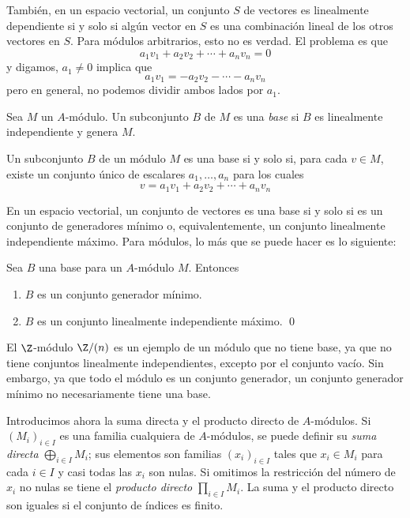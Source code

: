 También, en un espacio vectorial, un conjunto $S$ de vectores es linealmente dependiente si y solo si algún vector en $S$ es una combinación lineal de los otros vectores en $S$. Para módulos arbitrarios, esto no es verdad. El problema es que
\[
  a_1v_1 + a_2v_2 + \cdots + a_nv_n = 0
\]
y digamos, $a_1 \neq 0$ implica que 
\[
  a_1v_1 = -a_2v_2 - \cdots - a_nv_n
\]
pero en general, no podemos dividir ambos lados por $a_1$.

\begin{definition}
  Sea $M$ un $A$-módulo. Un subconjunto $B$ de $M$ es una \emph{base} si $B$ es linealmente independiente y genera $M$.
\end{definition}

\begin{theorem}
  Un subconjunto $B$ de un módulo $M$ es una base si y solo si, para cada $v \in M$, existe un conjunto único de escalares $a_1,\ldots,a_n$ para los cuales
  \[
    v = a_1v_1 + a_2v_2 + \cdots + a_nv_n \tag*{\qed}
  \]
\end{theorem}

En un espacio vectorial, un conjunto de vectores es una base si y solo si es un conjunto de generadores mínimo o, equivalentemente, un conjunto linealmente independiente máximo. Para módulos, lo más que se puede hacer es lo siguiente:

\begin{theorem}\label{theo:1.7.5}%
  Sea $B$ una base para un $A$-módulo $M$. Entonces
  \begin{enumerate}
    \item $B$ es un conjunto generador mínimo.
    \item $B$ es un conjunto linealmente independiente máximo. \qed
  \end{enumerate}
\end{theorem}

El $\Z$-módulo $\Z/(n)$ es un ejemplo de un módulo que no tiene base, ya que no tiene conjuntos linealmente independientes, excepto por el conjunto vacío. Sin embargo, ya que todo el módulo es un conjunto generador, un conjunto generador mínimo no necesariamente tiene una base.

Introducimos ahora la suma directa y el producto directo de $A$-módulos. Si $(M_i)_{i \in I}$ es una familia cualquiera de $A$-módulos, se puede definir su \emph{suma directa} $\bigoplus_{i \in I} M_i$; sus elementos son familias $(x_i)_{i \in I}$ tales que $x_i \in M_i$ para cada $i \in I$ y casi todas las $x_i$ son nulas. Si omitimos la restricción del número de $x_i$ no nulas se tiene el \emph{producto directo} $\prod_{i \in I} M_i$. La suma y el producto directo son iguales si el conjunto de índices es finito.

